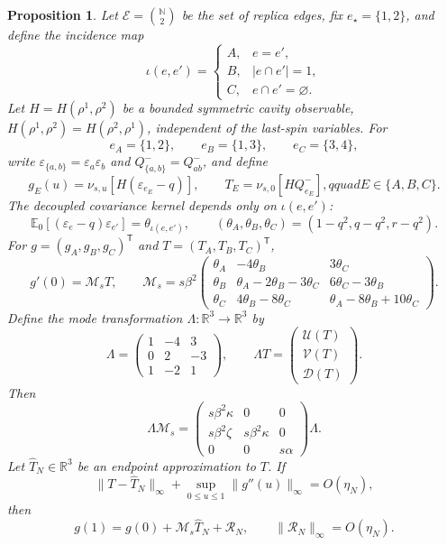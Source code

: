 \documentclass[11pt]{article}
\newtheorem{proposition}[theorem]{Proposition}
\numberwithin{equation}{section}
\newcommand{\1}{\mathbf 1}
\begin{document}
\begin{proposition}
\label{prop:cavity}
Let $\mathcal E=\binom{\mathbb N}{2}$ be the set of replica edges, fix
$e_\star=\{1,2\}$, and define the incidence map
\[
 \iota(e,e')=
 \begin{cases}
 A,&e=e',\\
 B,&|e\cap e'|=1,\\
 C,&e\cap e'=\varnothing.
 \end{cases}
\]
Let $H=H(\rho^1,\rho^2)$ be a bounded symmetric cavity observable,
$H(\rho^1,\rho^2)=H(\rho^2,\rho^1)$, independent of the last-spin
variables.  For
\[
 e_A=\{1,2\},\qquad e_B=\{1,3\},\qquad e_C=\{3,4\},
\]
write
$\varepsilon_{\{a,b\}}=\varepsilon_a\varepsilon_b$ and
$Q^-_{\{a,b\}}=Q^-_{ab}$, and define
\[
 g_E(u)=\nu_{s,u}[H(\varepsilon_{e_E}-q)],\qquad
 T_E=\nu_{s,0}[H Q^-_{e_E}],qquad E\in\{A,B,C\}.
\]
The decoupled covariance kernel depends only on $\iota(e,e')$:
\begin{equation}
 \mathbb E_0[(\varepsilon_e-q)\varepsilon_{e'}]
 =\theta_{\iota(e,e')},
 \qquad
 (\theta_A,\theta_B,\theta_C)
 =(1-q^2,q-q^2,r-q^2).
 \label{eq:cavity-edge-coefficients}
\end{equation}
For $g=(g_A,g_B,g_C)^{\mathsf T}$ and
$T=(T_A,T_B,T_C)^{\mathsf T}$,
\begin{equation}
 g'(0)=\mathcal M_sT,
 \qquad
 \mathcal M_s=s\beta^2
 \begin{pmatrix}
 \theta_A&-4\theta_B&3\theta_C\\
 \theta_B&\theta_A-2\theta_B-3\theta_C&6\theta_C-3\theta_B\\
 \theta_C&4\theta_B-8\theta_C&\theta_A-8\theta_B+10\theta_C
 \end{pmatrix}.
 \label{eq:cavity-edge-matrix}
\end{equation}
Define the mode transformation $\Lambda\colon\mathbb R^3\to\mathbb R^3$ by
\[
 \Lambda=
 \begin{pmatrix}
 1&-4&3\\
 0&2&-3\\
 1&-2&1
 \end{pmatrix},
 \qquad
 \Lambda T=
 \begin{pmatrix}
 \mathcal U(T)\\ \mathcal V(T)\\ \mathcal D(T)
 \end{pmatrix}.
\]
Then
\begin{equation}
 \Lambda\mathcal M_s
 =
 \begin{pmatrix}
 s\beta^2\kappa&0&0\\
 s\beta^2\zeta&s\beta^2\kappa&0\\
 0&0&s\alpha
 \end{pmatrix}\Lambda.
 \label{eq:cavity-general-modes}
\end{equation}
Let $\widehat T_N\in\mathbb R^3$ be an endpoint approximation to $T$.  If
\[
 \|T-\widehat T_N\|_\infty
 +\sup_{0\le u\le1}\|g''(u)\|_\infty=O(\eta_N),
\]
then
\[
 g(1)=g(0)+\mathcal M_s\widehat T_N+\mathcal R_N,
 \qquad
 \|\mathcal R_N\|_\infty=O(\eta_N).
\]
\end{proposition}
\end{document}
